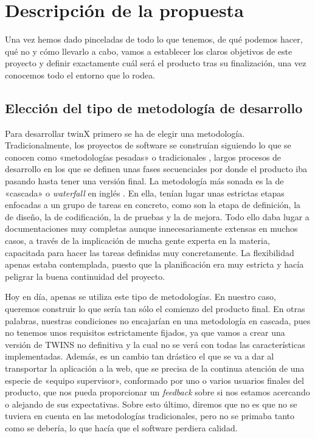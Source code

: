 \section{Descripción de la propuesta}
Una vez hemos dado pinceladas de todo lo que tenemos, de qué podemos hacer, qué no y cómo llevarlo a cabo, vamos a establecer los claros objetivos de este proyecto y definir exactamente cuál será el producto tras su finalización, una vez conocemos todo el entorno que lo rodea. 

\subsection{Elección del tipo de metodología de desarrollo}
\label{elecciónMetodología}
Para desarrollar twinX primero se ha de elegir una metodología. Tradicionalmente, los proyectos de software se construían siguiendo lo que se conocen como «metodologías pesadas» o tradicionales \cite{waterfall1}, largos procesos de desarrollo en los que se definen unas fases secuenciales por donde el producto iba pasando hasta tener una versión final. La metodología más sonada es la de «cascada» o \textit{waterfall} en inglés \cite{waterfall2}. En ella, tenían lugar unas estrictas etapas enfocadas a un grupo de tareas en concreto, como son la etapa de definición, la de diseño, la de codificación, la de pruebas y la de mejora. Todo ello daba lugar a documentaciones muy completas aunque innecesariamente extensas en muchos casos, a través de la implicación de mucha gente experta en la materia, capacitada para hacer las tareas definidas muy concretamente. La flexibilidad apenas estaba contemplada, puesto que la planificación era muy estricta y hacía peligrar la buena continuidad del proyecto.

Hoy en día, apenas se utiliza este tipo de metodologías. En nuestro caso, queremos construir lo que sería tan sólo el comienzo del producto final. En otras palabras, nuestras condiciones no encajarían en una metodología en cascada, pues no tenemos unos requisitos estrictamente fijados, ya que vamos a crear una versión de TWINS no definitiva y la cual no se verá con todas las características implementadas. Además, es un cambio tan drástico el que se va a dar al transportar la aplicación a la web, que se precisa de la continua atención de una especie de «equipo supervisor», conformado por uno o varios usuarios finales del producto, que nos pueda proporcionar un \textit{feedback} sobre si nos estamos acercando o alejando de sus expectativas. Sobre esto último, diremos que no es que no se tuviera en cuenta en las metodologías tradicionales, pero no se primaba tanto como se debería, lo que hacía que el software perdiera calidad.

